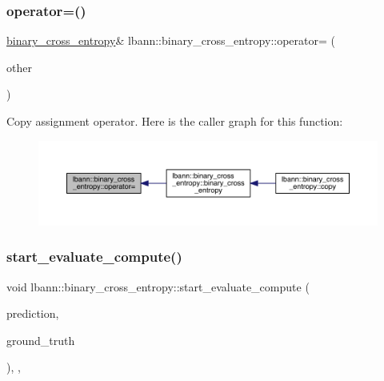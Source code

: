 \subsubsection{\texorpdfstring{operator=()}{operator=()}}
{\footnotesize\ttfamily \hyperlink{classlbann_1_1binary__cross__entropy}{binary\+\_\+cross\+\_\+entropy}\& lbann\+::binary\+\_\+cross\+\_\+entropy\+::operator= (\begin{DoxyParamCaption}\item[{const \hyperlink{classlbann_1_1binary__cross__entropy}{binary\+\_\+cross\+\_\+entropy} \&}]{other }\end{DoxyParamCaption})\hspace{0.3cm}{\ttfamily [default]}}

Copy assignment operator. Here is the caller graph for this function\+:\nopagebreak
\begin{figure}[H]
\begin{center}
\leavevmode
\includegraphics[width=350pt]{classlbann_1_1binary__cross__entropy_aff599d9d615b2c7ffa66b0dbc9555c0f_icgraph}
\end{center}
\end{figure}
\mbox{\label{classlbann_1_1binary__cross__entropy_a4acaf96a18b00b38adae375a69740071}} 
\subsubsection{\texorpdfstring{start\+\_\+evaluate\+\_\+compute()}{start\_evaluate\_compute()}}
{\footnotesize\ttfamily void lbann\+::binary\+\_\+cross\+\_\+entropy\+::start\+\_\+evaluate\+\_\+compute (\begin{DoxyParamCaption}\item[{const \hyperlink{base_8hpp_a9a697a504ae84010e7439ffec862b470}{Abs\+Dist\+Mat} \&}]{prediction,  }\item[{const \hyperlink{base_8hpp_a9a697a504ae84010e7439ffec862b470}{Abs\+Dist\+Mat} \&}]{ground\+\_\+truth }\end{DoxyParamCaption})\hspace{0.3cm}{\ttfamily [inline]}, {\ttfamily [override]}, {\ttfamily [virtual]}}


